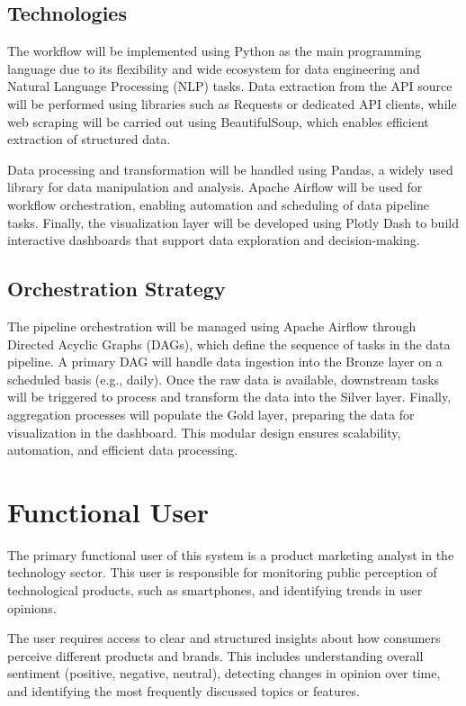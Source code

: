 \documentclass[12pt]{article}
\begin{document}
\subsection{Technologies}
The workflow will be implemented using Python as the main programming language due to its flexibility and wide ecosystem for data engineering and Natural Language Processing (NLP) tasks. Data extraction from the API source will be performed using libraries such as Requests or dedicated API clients, while web scraping will be carried out using BeautifulSoup, which enables efficient extraction of structured data.

Data processing and transformation will be handled using Pandas, a widely used library for data manipulation and analysis. Apache Airflow will be used for workflow orchestration, enabling automation and scheduling of data pipeline tasks. Finally, the visualization layer will be developed using Plotly Dash to build interactive dashboards that support data exploration and decision-making.

\subsection{Orchestration Strategy}
The pipeline orchestration will be managed using Apache Airflow through Directed Acyclic Graphs (DAGs), which define the sequence of tasks in the data pipeline. A primary DAG will handle data ingestion into the Bronze layer on a scheduled basis (e.g., daily). Once the raw data is available, downstream tasks will be triggered to process and transform the data into the Silver layer. Finally, aggregation processes will populate the Gold layer, preparing the data for visualization in the dashboard. 
This modular design ensures scalability, automation, and efficient data processing.

\section{Functional User}

The primary functional user of this system is a product marketing analyst in the technology sector. This user is responsible for monitoring public perception of technological products, such as smartphones, and identifying trends in user opinions.

The user requires access to clear and structured insights about how consumers perceive different products and brands. This includes understanding overall sentiment (positive, negative, neutral), detecting changes in opinion over time, and identifying the most frequently discussed topics or features.
\end{document}
